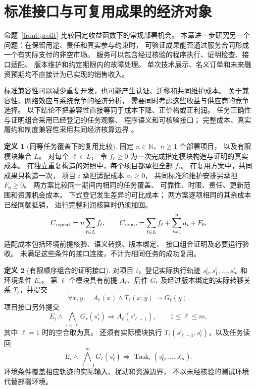\documentclass[UTF8,12pt,a4paper,openany,fontset=none,zihao=false]{ctexrep}
\theoremstyle{definition}
\newtheorem{definition}{定义}[chapter]
\newcommand{\NN}{\mathbb N}
\newcommand{\1}{\mathbf 1}
\begin{document}
\section{标准接口与可复用成果的经济对象}

命题~\ref{front:profit} 比较固定收益函数下的常规部署机会。
本章进一步研究另一个问题：在保留用途、责任和真实参与约束时，
可验证成果能否通过服务合同形成一个有实际支付的非空市场。
服务可以包含经过核验的程序执行、证明检查、接口适配、
版本维护和约定期限内的故障处理。
单次技术展示、名义订单和未来融资预期均不直接计为已实现的销售收入。

标准兼容性可以减少重复开发，也可能产生认证、迁移和共同维护成本。
关于兼容性、网络效应与系统竞争的经济分析，
需要同时考虑这些收益与供应商的竞争选择\cite{KatzShapiro1994}。
以下结论不把兼容性直接等同于成本下降、正价格或正利润。
任务正确性与证明组合采用已经登记的任务观察、
程序语义和可核验接口\cite{InternalTheory}；
完整成本、真实履约和制度兼容性采用共同经济核算边界
\cite{InternalEconomics}。

\begin{definition}[同等任务覆盖下的复用比较]
\label{market:reuse-data}
固定 \(n\in\NN\)、\(n\ge1\) 个部署项目，
以及有限模块集合 \(L\)。
对每个 \(\ell\in L\)，
令 \(f_\ell\ge0\) 为一次完成指定模块构造与证明的真实成本。
在独立重复构造的对照中，每个项目都承担全部 \(f_\ell\)。
在复用方案中，共同成果只构造一次，
项目 \(i\) 承担适配成本 \(a_i\ge0\)，
共同标准和维护安排另承担 \(F_0\ge0\)。
两方案比较同一期间内相同的任务覆盖、
可靠性、时限、责任、更新范围和资源机会成本。
下式登记发生差异的可比成本；
两方案逐项相同的其余成本已经同额抵销，
进行完整利润核算时仍须加回。
\[
 C_{\rm repeat}=n\sum_{\ell\in L}f_\ell,
 \qquad
 C_{\rm reuse}=\sum_{\ell\in L}f_\ell+\sum_{i=1}^n a_i+F_0.
\]
适配成本包括环境前提核验、语义转换、版本绑定、
接口组合证明及必要运行验收。
未满足这些条件的接口连接，不计为相同任务的成功复用。
\end{definition}

\begin{definition}[有限顺序组合的证明接口]
\label{market:proof-interface}
对项目 \(i\)，登记实际执行轨迹
\(s_0^i,s_1^i,\ldots,s_m^i\) 和环境条件 \(E_i\)。
第 \(\ell\) 个模块具有前提 \(A_\ell\)、后件 \(G_\ell\)
及经过版本绑定的实际转移关系 \(T_\ell\)，并提交
\[
 \forall x,y,\quad
 A_\ell(x)\land T_\ell(x,y)\Longrightarrow G_\ell(y).
\]
项目接口另外提交
\[
 E_i\land\bigwedge_{r<\ell}G_r(s_r^i)
 \Longrightarrow A_\ell(s_{\ell-1}^i),
 \qquad 1\le\ell\le m,
\]
其中 \(\ell=1\) 时的空合取为真。
还须有实际模块执行
\(T_\ell(s_{\ell-1}^i,s_\ell^i)\)，以及任务读回
\[
 E_i\land\bigwedge_{\ell=1}^mG_\ell(s_\ell^i)
 \Longrightarrow \operatorname{Task}_i(s_0^i,\ldots,s_m^i).
\]
环境条件覆盖相应轨迹的实际输入、扰动和资源边界，
不以未经核验的测试环境代替部署环境。
\end{definition}
\end{document}
